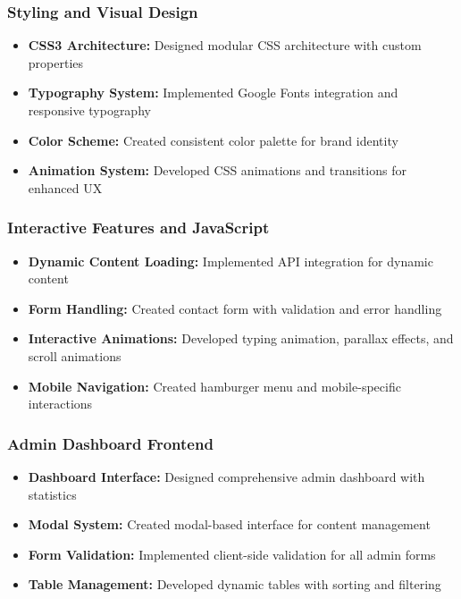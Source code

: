 \documentclass[12pt,a4paper]{report}
\begin{document}
\subsubsection{Styling and Visual Design}
\begin{itemize}
    \item \textbf{CSS3 Architecture:} Designed modular CSS architecture with custom properties
    \item \textbf{Typography System:} Implemented Google Fonts integration and responsive typography
    \item \textbf{Color Scheme:} Created consistent color palette for brand identity
    \item \textbf{Animation System:} Developed CSS animations and transitions for enhanced UX
\end{itemize}

\subsubsection{Interactive Features and JavaScript}
\begin{itemize}
    \item \textbf{Dynamic Content Loading:} Implemented API integration for dynamic content
    \item \textbf{Form Handling:} Created contact form with validation and error handling
    \item \textbf{Interactive Animations:} Developed typing animation, parallax effects, and scroll animations
    \item \textbf{Mobile Navigation:} Created hamburger menu and mobile-specific interactions
\end{itemize}

\subsubsection{Admin Dashboard Frontend}
\begin{itemize}
    \item \textbf{Dashboard Interface:} Designed comprehensive admin dashboard with statistics
    \item \textbf{Modal System:} Created modal-based interface for content management
    \item \textbf{Form Validation:} Implemented client-side validation for all admin forms
    \item \textbf{Table Management:} Developed dynamic tables with sorting and filtering
\end{itemize}
\end{document}
